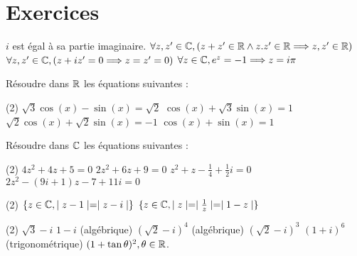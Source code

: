 \section{Exercices}



\begin{exercise}[subtitle= Assertions justes ou fausses ?, difficulty=*]
		\begin{tasks} 
			\task $i$ est égal à sa partie imaginaire. 
			\task $\forall z,z' \in \mathbb{C}, ( z+z' \in \mathbb{R} \wedge z.z' \in \mathbb{R} \Longrightarrow z,z' \in \mathbb{R})$
			\task $\forall z,z' \in \mathbb{C}, (z+iz' = 0 \Longrightarrow z = z' = 0)$
			\task $\forall z \in \mathbb{C}, e^z = -1 \Longrightarrow z = i\pi$
		\end{tasks}
\end{exercise}


\begin{exercise}[subtitle= Résolution d'équations dans $\RR$, difficulty=*]
	Résoudre dans $\RR$ les équations suivantes : 
	\begin{tasks}(2) 
		\task $\sqrt{3} \cos(x) - \sin(x) = \sqrt{2}$
	    \task $\cos(x) + \sqrt{3}\sin(x) = 1$
	    \task $\sqrt{2}\cos(x) + \sqrt{2}\sin(x) = -1$
	    \task $\cos(x) + \sin(x) = 1$
	\end{tasks}
\end{exercise}

\begin{exercise}[subtitle= Résolution d'équations dans $\CC$, difficulty=***]
	Résoudre dans $\CC$ les équations suivantes : 
	\begin{tasks}(2) 
		\task $4z^2 + 4z + 5 = 0$
		\task $2z^2 + 6z + 9= 0$
		\task $z^2 + z - \frac{1}{4} +\frac{1}{2}i = 0$
		\task $2z^2-(9i+1)z-7+11i=0$
	\end{tasks}
\end{exercise}


\begin{exercise}[subtitle= Déterminer les ensembles, difficulty=**]
	\begin{tasks}(2) 
		\task $\{z \in \mathbb{C}, \mid z-1 \mid = \mid z - i\mid\}$
		\task $\{z \in \mathbb{C}, \mid z \mid = \mid \frac{1}{z}\mid = \mid 1 -z \mid\}$
	\end{tasks}
\end{exercise}


\begin{exercise}[subtitle=Transformer le nombre complexe sous une autre forme, difficulty=*]
	\begin{tasks}(2)
		\task $\sqrt{3} - i$ 
		\task $1 - i$
		\task (algébrique) $(\sqrt{2} - i)^4$
		\task (algébrique) $(\sqrt{2} - i)^3$
		\task $(1+i)^6$
		\task (trigonométrique)	$ (1 + \tan{\theta})^2, \theta \in \mathbb{R}$.  
	\end{tasks}
\end{exercise}

